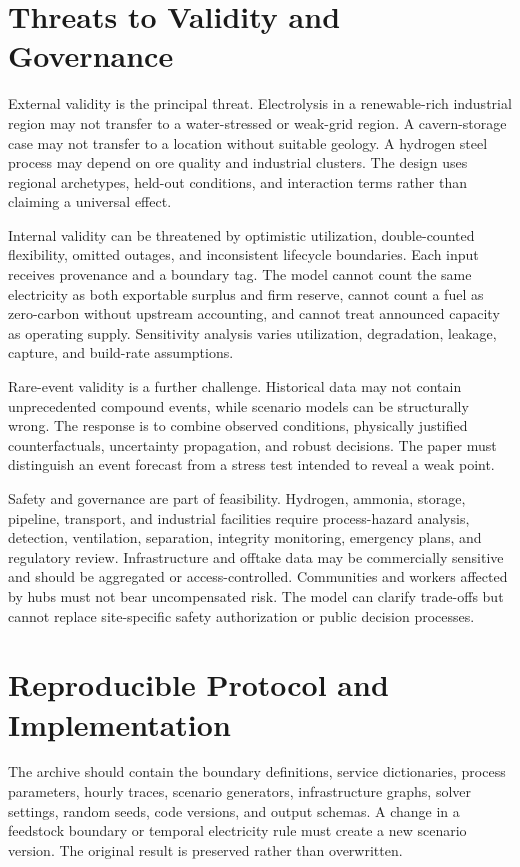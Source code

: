 \documentclass[conference]{IEEEtran}
\begin{document}
\section{Threats to Validity and Governance}
\label{sec:threats}
External validity is the principal threat. Electrolysis in a renewable-rich industrial region may not transfer to a water-stressed or weak-grid region. A cavern-storage case may not transfer to a location without suitable geology. A hydrogen steel process may depend on ore quality and industrial clusters. The design uses regional archetypes, held-out conditions, and interaction terms rather than claiming a universal effect.

Internal validity can be threatened by optimistic utilization, double-counted flexibility, omitted outages, and inconsistent lifecycle boundaries. Each input receives provenance and a boundary tag. The model cannot count the same electricity as both exportable surplus and firm reserve, cannot count a fuel as zero-carbon without upstream accounting, and cannot treat announced capacity as operating supply. Sensitivity analysis varies utilization, degradation, leakage, capture, and build-rate assumptions.

Rare-event validity is a further challenge. Historical data may not contain unprecedented compound events, while scenario models can be structurally wrong. The response is to combine observed conditions, physically justified counterfactuals, uncertainty propagation, and robust decisions. The paper must distinguish an event forecast from a stress test intended to reveal a weak point.

Safety and governance are part of feasibility. Hydrogen, ammonia, storage, pipeline, transport, and industrial facilities require process-hazard analysis, detection, ventilation, separation, integrity monitoring, emergency plans, and regulatory review. Infrastructure and offtake data may be commercially sensitive and should be aggregated or access-controlled. Communities and workers affected by hubs must not bear uncompensated risk. The model can clarify trade-offs but cannot replace site-specific safety authorization or public decision processes.

\section{Reproducible Protocol and Implementation}
\label{sec:repro}
The archive should contain the boundary definitions, service dictionaries, process parameters, hourly traces, scenario generators, infrastructure graphs, solver settings, random seeds, code versions, and output schemas. A change in a feedstock boundary or temporal electricity rule must create a new scenario version. The original result is preserved rather than overwritten.
\end{document}
